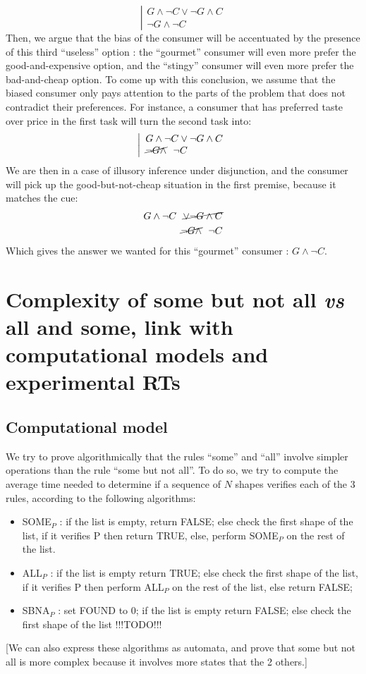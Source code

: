 \documentclass[]{article}
\begin{document}
\begin{equation}
\left |
\begin{array}{l}
G \wedge \neg C \vee \neg G \wedge C \\
\neg G \wedge \neg C
\end{array} \right.
\end{equation}
Then, we argue that the bias of the consumer will be accentuated by the presence of this third ``useless'' option : the ``gourmet'' consumer will even more prefer the good-and-expensive option, and the ``stingy'' consumer will even more prefer the bad-and-cheap option. To come up with this conclusion, we assume that the biased consumer only pays attention to the parts of the problem that does not contradict their preferences. For instance, a consumer that has preferred taste over price in the first task will turn the second task into:
\begin{equation}
\left | \begin{array}{l}
G \wedge \neg C \vee \neg G \wedge C \\
\cancel{\neg G \wedge} \ \ \neg C
\end{array}\right .
\end{equation}
We are then in a case of illusory inference under disjunction, and the consumer will pick up the good-but-not-cheap situation in the first premise, because it matches the cue:
\begin{eqnarray}
G \wedge \neg C \ \ \cancel{\vee \neg G \wedge C} \\
\cancel{\neg G \wedge} \ \ \neg C
\end{eqnarray}
Which gives the answer we wanted for this ``gourmet'' consumer : $G \wedge \neg C$.

\section{Complexity of some but not all \textit{vs} all and some, link with computational models and experimental RTs}
\subsection{Computational model}
We try to prove algorithmically that the rules ``some'' and ``all'' involve simpler operations than the rule ``some but not all''. To do so, we try to compute the average time needed to determine if a sequence of $N$ shapes verifies each of the 3 rules, according to the following algorithms:
\begin{itemize}
	\item SOME$_P$ : if the list is empty, return FALSE; else check the first shape of the list, if it verifies P then return TRUE, else, perform SOME$_P$ on the rest of the list. 
	\item ALL$_P$ : if the list is empty return TRUE; else check the first shape of the list, if it verifies P then perform ALL$_P$ on the rest of the list, else return FALSE;
	\item SBNA$_P$ : set FOUND to 0; if the list is empty return FALSE; else check the first shape of the list !!!TODO!!!
\end{itemize}
[We can also express these algorithms as automata, and prove that some but not all is more complex because it involves more states that the 2 others.]
\end{document}
